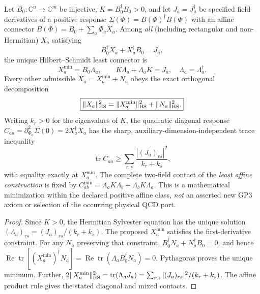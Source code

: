 \documentclass[12pt,a4paper]{article}
\begin{document}
\begin{theorem}
\label{p11:thm:v374-axial-minimal-positive-contact}
Let $B_0:\mathbb C^n\to\mathbb C^m$ be injective,
$K=B_0^\dagger B_0>0$, and let $J_a=J_a^\dagger$ be specified
field derivatives of a positive response
$\Sigma(\Phi)=B(\Phi)^\dagger B(\Phi)$ with an affine connector
$B(\Phi)=B_0+\sum_a\Phi_aX_a$.  Among \emph{all} (including
rectangular and non-Hermitian) $X_a$ satisfying
\[
 B_0^\dagger X_a+X_a^\dagger B_0=J_a,
\]
the unique Hilbert--Schmidt least connector is
\[
 \boxed{X_a^{\min}=B_0\Lambda_a,\qquad
 K\Lambda_a+\Lambda_a K=J_a,\quad\Lambda_a=\Lambda_a^\dagger.}
\]
Every other admissible $X_a=X_a^{\min}+N_a$ obeys the exact
orthogonal decomposition
\[
 \boxed{\|X_a\|_{\rm HS}^2=\|X_a^{\min}\|_{\rm HS}^2
       +\|N_a\|_{\rm HS}^2.}
\]
Writing $k_r>0$ for the eigenvalues of $K$, the quadratic diagonal
response $C_{aa}=\partial_{\Phi_a}^2\Sigma(0)=2X_a^\dagger X_a$
has the sharp, auxiliary-dimension-independent trace inequality
\[
 \boxed{\operatorname{tr}C_{aa}\ge
 \sum_{r,s}\frac{|(J_a)_{rs}|^2}{k_r+k_s},}
\]
with equality exactly at $X_a^{\min}$. The complete two-field
contact of the \emph{least affine construction} is fixed by
$C_{ab}^{\min}=\Lambda_aK\Lambda_b+\Lambda_bK\Lambda_a$.
This is a mathematical minimization within the declared positive
affine class, \emph{not} an asserted new GP3 axiom or selection of
the occurring physical QCD port.
\end{theorem}
\begin{proof}
Since $K>0$, the Hermitian Sylvester equation has the unique
solution $(\Lambda_a)_{rs}=(J_a)_{rs}/(k_r+k_s)$.
The proposed $X_a^{\min}$ satisfies the first-derivative constraint.
For any $N_a$ preserving that constraint,
$B_0^\dagger N_a+N_a^\dagger B_0=0$, and hence
$\operatorname{Re}\operatorname{tr}[(X_a^{\min})^\dagger N_a]
=\operatorname{Re}\operatorname{tr}(\Lambda_a B_0^\dagger N_a)=0$.
Pythagoras proves the unique minimum. Further,
$2\|X_a^{\min}\|_{\rm HS}^2
=\operatorname{tr}(\Lambda_aJ_a)
=\sum_{r,s}|(J_a)_{rs}|^2/(k_r+k_s)$.
The affine product rule gives the stated diagonal and mixed contacts.
\end{proof}
\end{document}
